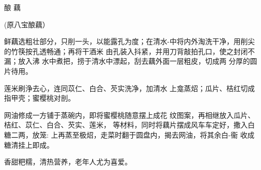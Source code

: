 \begin{recipe}{酿	藕}

(原八宝酿藕）

\ingredients



\cooking

\step 	鲜藕选粗壮部分，只削一头，以能露孔为度；在清水-中将内外淘洗干净，用削尖的竹筷按孔透畅通；再将干酒米 由孔装入抖紧，并用刀背敲拍孔口，使之封闭不漏；放入沸 水中煮把，捞于清水中漂起，刮去藕外面一层粗皮，切成两 分厚的圆片待用。

\step 	莲米刷浄去心，连同苡仁、白合、芡实洗净，加清水 上龛蒸炤；瓜片、桔红切成指甲壳；蜜樱桃对剖。

\step 	网油修成一方铺于蒸碗内，即将蜜樱桃随意摆上成花 纹图案，再相继放入瓜片、桔红、苡仁、白合、芡实、莲米， 等材料，同时将藕片摆成风车车定好，撒入白糖二两，放笼: 上再蒸至极炤，走菜时翻于圆盘内，揭去网油，将其余白-衞 收成糖清挂上即成。

\notes

香甜粑糯，清热营养，老年人尤为喜爱。

\end{recipe}

